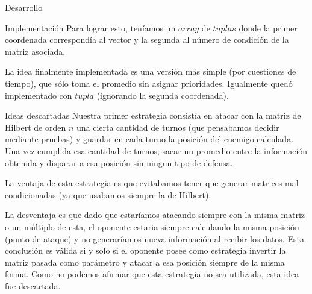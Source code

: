 \begin{section}{Desarrollo}
\begin{subsection}{Implementación}
		Para lograr esto, teníamos un $array$ de $tuplas$ donde la primer coordenada correspondía al vector y la segunda al número de condición de la matriz asociada.
		
		La idea finalmente implementada es una versión más simple (por cuestiones de tiempo), que sólo toma el promedio sin asignar prioridades. Igualmente quedó implementado con $tupla$ (ignorando la segunda coordenada).
	\end{subsection}
	\begin{subsection}{Ideas descartadas}
		Nuestra primer estrategia consistía en atacar con la matriz de Hilbert de orden $n$ una cierta cantidad de turnos (que pensabamos decidir mediante pruebas) y guardar en cada turno la posición del enemigo calculada. Una vez cumplida esa cantidad de turnos, sacar un promedio entre la información obtenida y disparar a esa posición sin ningun tipo de defensa.
		
		La ventaja de esta estrategia es que evitabamos tener que generar matrices mal condicionadas (ya que usabamos siempre la de Hilbert).
		
		La desventaja es que dado que estaríamos atacando siempre con la misma matriz o un múltiplo de esta, el oponente estaria siempre calculando la misma posición (punto de ataque) y no generaríamos nueva información al recibir los datos. Esta conclusión es válida si y solo si el oponente posee como estrategia invertir la matriz pasada como parámetro y atacar a esa posición siempre de la misma forma. Como no podemos afirmar que esta estrategia no sea utilizada, esta idea fue descartada.
	\end{subsection}
\end{section}
